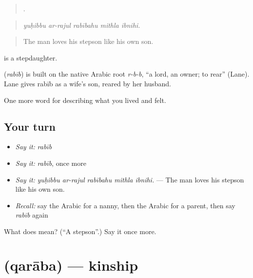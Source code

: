 \begin{quote}
    .
\end{quote}

\begin{quote}
\emph{yuḥibbu ar-rajul rabībahu mithla ibnihi.}
\end{quote}

\begin{quote}
The man loves his stepson like his own son.
\end{quote}

 is a stepdaughter.

\begin{cousinweb}
\textbf{} (\emph{rabīb}) is built on the native Arabic root \emph{r-b-b}, \textquotedblleft{}a lord, an owner; to rear\textquotedblright{} (Lane). Lane gives rabīb as a wife's son, reared by her husband.
\end{cousinweb}

\begin{grammarlens}[title={What you've built}]
One more word for describing what you lived and felt.
\end{grammarlens}

\subsection*{Your turn}
\begin{itemize}
\raggedright
  \item \emph{Say it:} \emph{rabīb}
  \item \emph{Say it:} \emph{rabīb}, once more
  \item \emph{Say it:} \emph{yuḥibbu ar-rajul rabībahu mithla ibnihi.} — The man loves his stepson like his own son.
  \item \emph{Recall:} say the Arabic for a nanny, then the Arabic for a parent, then say \emph{rabīb} again
\end{itemize}

\begin{tcolorbox}[breakable,colback=teal!4,colframe=teal!35!black,title={Before you move on}]
What does  mean? (\textquotedblleft{}A stepson\textquotedblright{}.) Say it once more.
\end{tcolorbox}
\section[\texorpdfstring{\ar{قرابة} (qarāba)}{قرابة (qarāba)}]{ (qarāba) — kinship}

